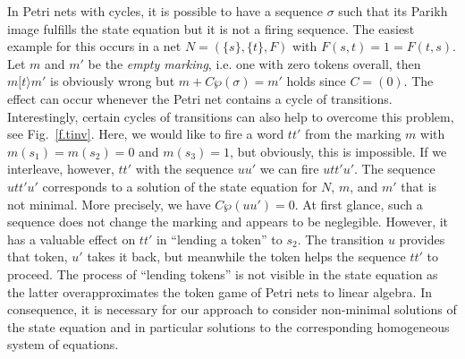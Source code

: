 \documentclass{LMCS}
\newcommand{\step}[1]{[#1\rangle}
\newcommand{\parikh}{\wp}
\newcommand{\I}{C} \newcommand{\C}{{\ensuremath \Gamma}} \newcommand{\ord}{\ensuremath{\Omega}}
\begin{document}
In Petri nets with cycles, it is possible to have a sequence $\sigma$ such that its Parikh image fulfills the state equation but it is
not a firing sequence. 
The easiest example for this occurs in a net $N=(\{s\},\{t\},F)$ with $F(s,t)=1=F(t,s)$.
Let $m$ and $m'$ be the {\em empty marking}, i.e. one with zero tokens overall, then $m\step{t}m'$ is
obviously wrong but $m+\I\parikh(\sigma)=m'$ holds since $\I=(0)$. The effect can occur whenever the Petri net
contains a cycle of transitions. Interestingly, certain cycles of transitions can also help to overcome
this problem, see Fig.~\ref{f.tinv}. Here, we would like to fire a word $tt'$ from the marking $m$ with
$m(s_1)=m(s_2)=0$ and $m(s_3)=1$, but obviously, this is impossible. If we interleave, however, $tt'$ with the sequence $uu'$
we can fire $utt'u'$. The sequence $utt'u'$ corresponds to a solution of the state equation for $N$, $m$, and $m'$ that is not minimal.
More precisely, we have $\I\parikh(uu') = 0$. At first glance, such a sequence does not change the marking and appears to be neglegible.
However, it has a valuable effect on $tt'$ in ``lending a token'' to $s_2$. The transition $u$ provides that token, $u'$ takes it back, but meanwhile the token
helps the sequence $tt'$ to proceed. The process of ``lending tokens'' is not visible in the state equation as the latter overapproximates the
token game of Petri nets to linear algebra. In consequence, it is necessary for our approach to consider non-minimal solutions of the state equation
and in particular solutions to the corresponding homogeneous system of equations.
\end{document}
